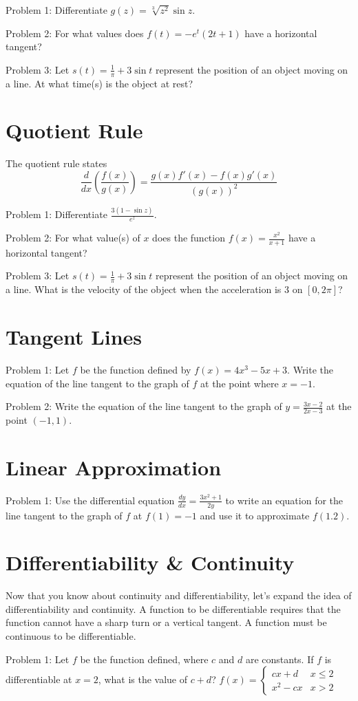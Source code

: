 \documentclass[../abcalc.tex]{subfiles}
\begin{document}
Problem 1: Differentiate $g(z)=\sqrt[3]{z^2}\sin z$.

Problem 2: For what values does $f(t)=-e^t(2t+1)$ have a horizontal tangent? 

Problem 3: Let $s(t)=\frac{1}{\pi}+3\sin t$ represent the position of an object moving on a line. At what time(s) is the object at rest?
\section{Quotient Rule}
The quotient rule states 
\[\frac{d}{dx}\left(\frac{f(x)}{g(x)}\right) = \frac{g(x)f'(x)-f(x)g'(x)}{(g(x))^2}\]

Problem 1: Differentiate $\frac{3(1-\sin z)}{e^z}$.

Problem 2: For what value(s) of $x$ does the function $f(x)=\frac{x^2}{x+1}$ have a horizontal tangent?

Problem 3: Let $s(t)=\frac{1}{\pi}+3\sin t$ represent the position of an object moving on a line. What is the velocity of the object 
when the acceleration is 3 on $[0, 2\pi]$?
\section{Tangent Lines}
Problem 1: Let $f$ be the function defined by $f(x)=4x^3-5x+3$. Write the equation of the line tangent to the graph of $f$ at the point where $x=-1$.

Problem 2: Write the equation of the line tangent to the graph of $y=\frac{3x-2}{2x-3}$ at the point $(-1,1)$.
\section{Linear Approximation}
Problem 1: Use the differential equation $\frac{dy}{dx}=\frac{3x^2+1}{2y}$ to write an equation for the line tangent to the graph of $f$
at $f(1)=-1$ and use it to approximate $f(1.2)$.
\section{Differentiability \& Continuity}
Now that you know about continuity and differentiability, let's expand the idea of differentiability and continuity. A function to be differentiable requires that the function cannot have a sharp turn or a vertical tangent.
A function must be continuous to be differentiable. 

Problem 1: Let $f$ be the function defined, where $c$ and $d$ are constants. If $f$ is differentiable at $x=2$, what is the value of $c+d$? 
\( f(x)=
\begin{cases}
    cx+d& x\leq 2\\
    x^2-cx& x>2
\end{cases}\)
\end{document}

